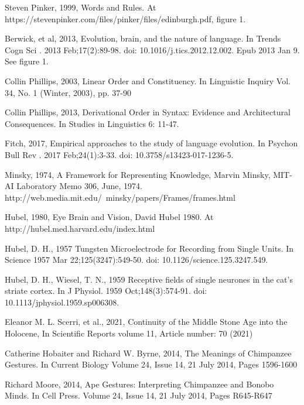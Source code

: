 \documentclass{clv3}
\begin{document}
\begin{unenumerate}
\item Steven Pinker, 1999, Words and Rules.  At https://stevenpinker.com/files/pinker/files/edinburgh.pdf,  figure 1.

\item Berwick, et al, 2013, Evolution, brain, and the nature of language. In Trends Cogn Sci
. 2013 Feb;17(2):89-98. doi: 10.1016/j.tics.2012.12.002. Epub 2013 Jan 9.  See figure 1.


\item  Collin Phillips, 2003, Linear Order and Constituency.  In  Linguistic Inquiry
Vol. 34, No. 1 (Winter, 2003), pp. 37-90  


\item Collin Phillips, 2013, Derivational Order in Syntax: Evidence and Architectural Consequences. In Studies in Linguistics 6: 11-47.


\item Fitch, 2017,  Empirical approaches to the study of language evolution.  In Psychon Bull Rev
. 2017 Feb;24(1):3-33. doi: 10.3758/s13423-017-1236-5. 


\item  Minsky, 1974, A Framework for Representing Knowledge, Marvin Minsky, MIT-AI Laboratory Memo 306, June, 1974.  http://web.media.mit.edu/~minsky/papers/Frames/frames.html

  
\item  Hubel, 1980, Eye Brain and Vision, David Hubel 1980.  At http://hubel.med.harvard.edu/index.html 

\item Hubel, D. H., 1957  Tungsten Microelectrode for Recording from Single Units. In Science 1957 Mar 22;125(3247):549-50. doi: 10.1126/science.125.3247.549. 

\item Hubel, D. H., Wiesel, T. N., 1959 Receptive fields of single neurones in the cat's striate cortex.  In J Physiol.  1959 Oct;148(3):574-91. doi: 10.1113/jphysiol.1959.sp006308. 


\item Eleanor M. L. Scerri, et al., 2021, Continuity of the Middle Stone Age into the Holocene, In Scientific Reports volume 11, Article number: 70 (2021)

  
\item Catherine Hobaiter and Richard W. Byrne, 2014, The Meanings of Chimpanzee Gestures. In Current Biology Volume 24, Issue 14, 21 July 2014, Pages 1596-1600

\item  Richard Moore, 2014, Ape Gestures: Interpreting Chimpanzee and Bonobo Minds.  In Cell Press. Volume 24, Issue 14, 21 July 2014, Pages R645-R647


\end{unenumerate}
\end{document}
